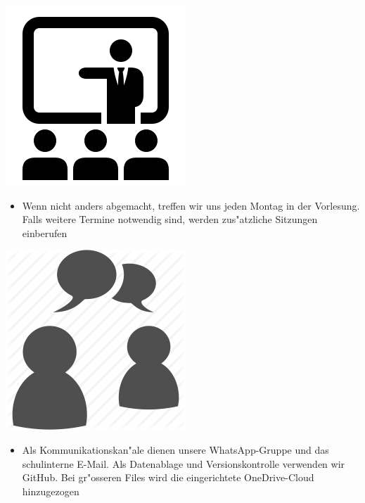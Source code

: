 \documentclass[12pt]{article}
\begin{document}
\begin{center}
\includegraphics[scale=0.3]{lecture}\\
\end{center}

\begin{itemize}
\item Wenn nicht anders abgemacht, treffen wir uns jeden Montag in der Vorlesung. Falls weitere Termine notwendig sind, werden zus"atzliche Sitzungen einberufen \\
\end{itemize}

\begin{center}
\includegraphics[scale=0.25]{communication}\\
\end{center}

\begin{itemize}
\item Als Kommunikationskan"ale dienen unsere WhatsApp-Gruppe und das schulinterne E-Mail. Als Datenablage und Versionskontrolle verwenden wir GitHub. Bei gr"osseren Files wird die eingerichtete OneDrive-Cloud hinzugezogen\\\\
\end{itemize}
\end{document}
